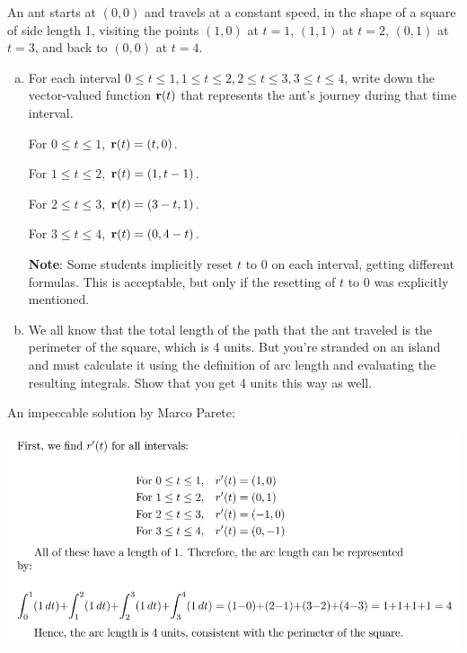 \begin{problem}
  An ant starts at $(0,0)$ and travels at a constant speed, in the shape of a square of side length 1, visiting the points $(1,0)$ at $t=1$, $(1,1)$ at $t=2$, $(0,1)$ at $t=3$, and back to $(0,0)$ at $t=4$.
  \begin{enumerate}[(a)]
    \item For each interval $0\leq t\leq 1,1\leq t\leq 2, 2\leq t\leq 3, 3\leq t\leq 4$, write down the vector-valued function $\mathbf r(t)$ that represents the ant's journey during that time interval.
    \begin{solution}
      For $0\leq t\leq 1$, $\mathbf r(t)=(t,0)$.

      For $1\leq t\leq 2$, $\mathbf r(t)=(1,t-1)$.

      For $2\leq t\leq 3$, $\mathbf r(t)=(3-t,1)$.

      For $3\leq t\leq 4$, $\mathbf r(t)=(0, 4-t)$.

      \textbf{Note}: Some students implicitly reset $t$ to 0 on each interval, getting different formulas. This is acceptable, but only if the resetting of $t$ to 0 was explicitly mentioned.
    \end{solution}
    \item We all know that the total length of the path that the ant traveled is the perimeter of the square, which is 4 units. But you're stranded on an island and must calculate it using the definition of arc length and evaluating the resulting integrals. Show that you get 4 units this way as well.
  \end{enumerate}
  \begin{solution}
    An impeccable solution by Marco Parete:

    \includegraphics[width=\textwidth]{nice/p3.1b_marco.png}
  \end{solution}
\end{problem}


